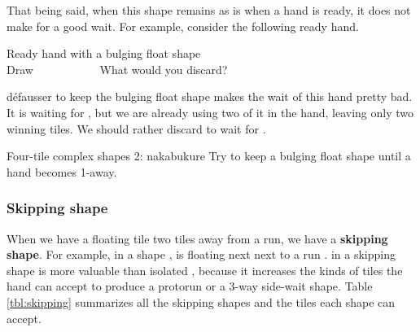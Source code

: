{\bigskip
That being said, when this shape remains as is when a hand is ready, it does not make for a good wait. For example, consider the following ready hand. 
\begin{itembox}[r]{Ready hand with a bulging float shape}
\bp
{}\bei\zhong\zhong\zhong~\\
\hfill\footnotesize{Draw~~~~~~~~~~~}
\ep 
\vspace{-15pt}What would you discard? \vspace{-5pt}
\end{itembox}
\noindent
défausser {\LARGE\bei} to keep the bulging float shape {\LARGE{}} makes the wait of this hand pretty bad. It is waiting for {\LARGE{}}, but we are already using two of it in the hand, leaving only two winning tiles. We should rather discard {\LARGE{}} to wait for {\LARGE\bei}. 

\vfill
\color{MyRed}
\begin{itembox}[c]{Four-tile complex shapes 2: {\jap nakabukure}}
\normalcolor
Try to keep a bulging float shape until a hand becomes 1-away.
\end{itembox}\normalcolor

\subsubsection{Skipping shape}
When we have a floating tile two tiles away from a run, we have a {\bf skipping shape}. For example, in a shape {\LARGE{}}, {\LARGE{}} is floating next next to a run {\LARGE{}}. {\LARGE{}} in a skipping shape is more valuable than isolated {\LARGE{}}, because it increases the kinds of tiles the hand can accept to produce a protorun or a 3-way side-wait shape. Table \ref{tbl:skipping} summarizes all the skipping shapes and the tiles each shape can accept. 

}
